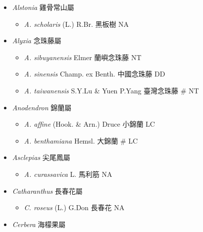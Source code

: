 
  \begin{itemize}
 \item[] \textit{Alstonia} 雞骨常山屬
                                
  \begin{itemize}
        \item[] \textit{A. scholaris} (L.) R.Br.  黑板樹   NA
  \end{itemize}
 \item[] \textit{Alyxia} 念珠藤屬
                                
  \begin{itemize}
        \item[] \textit{A. sibuyanensis} Elmer  蘭嶼念珠藤   NT
        \item[] \textit{A. sinensis} Champ. ex Benth.  中國念珠藤   DD
        \item[] \textit{A. taiwanensis} S.Y.Lu \& Yuen P.Yang  臺灣念珠藤  \# NT
  \end{itemize}
 \item[] \textit{Anodendron} 錦蘭屬
                                
  \begin{itemize}
        \item[] \textit{A. affine} (Hook. \& Arn.) Druce  小錦蘭   LC
        \item[] \textit{A. benthamiana} Hemsl.  大錦蘭  \# LC
  \end{itemize}
 \item[] \textit{Asclepias} 尖尾鳳屬
                                
  \begin{itemize}
        \item[] \textit{A. curassavica} L.  馬利筋   NA
  \end{itemize}
 \item[] \textit{Catharanthus} 長春花屬
                                
  \begin{itemize}
        \item[] \textit{C. roseus} (L.) G.Don  長春花   NA
  \end{itemize}
 \item[] \textit{Cerbera} 海檬果屬
                                

\end{itemize}
